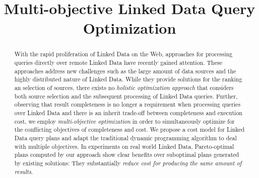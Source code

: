 \documentclass{sig-alternate}
\title{Multi-objective Linked Data Query Optimization}
\author{
}
\begin{document}
\maketitle
\begin{abstract} 
  With the rapid proliferation of Linked Data on the Web, approaches for processing queries directly over remote Linked Data have recently gained attention. These approaches address
  new challenges such as the large amount of data sources and the
  highly distributed nature of Linked Data. While they provide solutions for the ranking an selection of sources, there exists no \emph{holistic optimization approach} that considers both source selection and the subsequent processing of Linked Data queries. Further, observing that result completeness is no longer a requirement when processing queries over Linked Data and
  there is an inherit trade-off between completeness and execution cost, we employ \emph{multi-objective optimization} in order to
  simultaneously optimize for the conflicting objectives of completeness
  and cost. We 
  propose a cost model for Linked Data query plans and adapt the traditional dynamic programming
  algorithm to deal with multiple objectives. In experiments on real world Linked Data, Pareto-optimal plans computed by our approach show clear benefits over suboptimal plans generated by existing solutions: They substantially \emph{reduce cost for producing the same amount of results}. 

\end{abstract}





%







%
\end{document}

